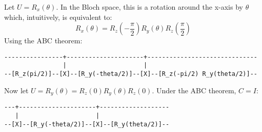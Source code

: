 \begingroup
\newcommand{\roto}[2]{R_{#1} \left( #2 \right)}
%
\par Let $U = \roto{x}{\theta}$.
%
In the Bloch space, this is a rotation around the x-axis by $\theta$ which, intuitively, is equivalent to:
%
$$
\roto{x}{\theta} = \roto{z}{-\frac{\pi}{2}} \roto{y}{\theta} \roto{z}{\frac{\pi}{2}}
$$
%
Using the ABC theorem:
%
\begin{verbatim}
----------------+---------------------+------------------------------
                |                     |
--[R_z(pi/2)]--[X]--[R_y(-theta/2)]--[X]--[R_z(-pi/2) R_y(theta/2)]--
\end{verbatim}
%
\par Now let $U = \roto{y}{\theta} = \roto{z}{0} \roto{y}{\theta} \roto{z}{0}$.
%
Under the ABC theorem, $C = I$:
\begin{verbatim}
---+---------------------+-------------------
   |                     |
--[X]--[R_y(-theta/2)]--[X]--[R_y(theta/2)]--
\end{verbatim}
%
\endgroup

